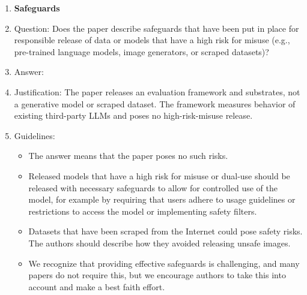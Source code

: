 \documentclass{article}
\begin{document}
\begin{enumerate}
\item {\bf Safeguards}
    \item[] Question: Does the paper describe safeguards that have been put in place for responsible release of data or models that have a high risk for misuse (e.g., pre-trained language models, image generators, or scraped datasets)?
    \item[] Answer: \answerNA{} %
    \item[] Justification: The paper releases an evaluation framework and substrates, not a generative model or scraped dataset. The framework measures behavior of existing third-party LLMs and poses no high-risk-misuse release.
    \item[] Guidelines:
    \begin{itemize}
        \item The answer \answerNA{} means that the paper poses no such risks.
        \item Released models that have a high risk for misuse or dual-use should be released with necessary safeguards to allow for controlled use of the model, for example by requiring that users adhere to usage guidelines or restrictions to access the model or implementing safety filters. 
        \item Datasets that have been scraped from the Internet could pose safety risks. The authors should describe how they avoided releasing unsafe images.
        \item We recognize that providing effective safeguards is challenging, and many papers do not require this, but we encourage authors to take this into account and make a best faith effort.
    \end{itemize}


\end{enumerate}
\end{document}
